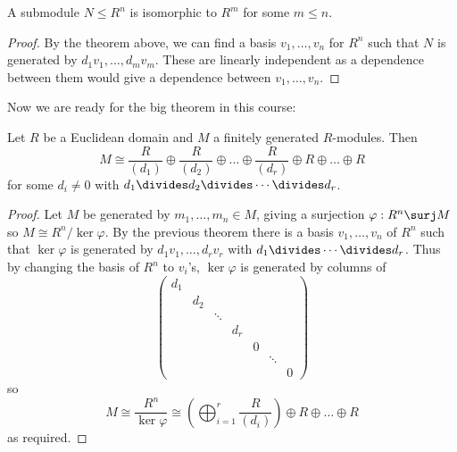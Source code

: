 \documentclass[a4paper]{article}
\theoremstyle{definition}
\begin{document}
\begin{corollary}
  A submodule \(N \leq R^n\) is isomorphic to \(R^m\) for some \(m \leq n\).
\end{corollary}

\begin{proof}
  By the theorem above, we can find a basis \(v_1, \dots, v_n\) for \(R^n\) such that \(N\) is generated by \(d_1v_1, \dots, d_mv_m\). These are linearly independent as a dependence between them would give a dependence between \(v_1, \dots, v_n\).
\end{proof}

Now we are ready for the big theorem in this course:

\begin{theorem}
  \label{thm:module over ED}
  Let \(R\) be a Euclidean domain and \(M\) a finitely generated \(R\)-modules. Then
  \[
    M \cong \frac{R}{(d_1)} \oplus \frac{R}{(d_2)} \oplus \dots \oplus \frac{R}{(d_r)} \oplus R \oplus \dots \oplus R
  \]
  for some \(d_i \neq 0\) with \(d_1 \divides d_2 \divides \cdots \divides d_r\).
\end{theorem}

\begin{proof}
  Let \(M\) be generated by \(m_1, \dots, m_n \in M\), giving a surjection \(\varphi: R^n \surj M\) so \(M \cong R^n/\ker \varphi\). By the previous theorem there is a basis \(v_1, \dots, v_n\) of \(R^n\) such that \(\ker \varphi\) is generated by \(d_1v_1, \dots, d_rv_r\) with \(d_1 \divides \cdots \divides d_r\). Thus by changing the basis of \(R^n\) to \(v_i\)'s, \(\ker \varphi\) is generated by columns of
  \[
    \begin{pmatrix}
      d_1 \\
      & d_2 \\
      & & \ddots \\
      & & & d_r \\
      & & & & 0 \\
      & & & & & \ddots \\
      & & & & & & 0
    \end{pmatrix}
  \]
  so
  \[
    M \cong \frac{R^n}{\ker \varphi} \cong \left( \bigoplus_{i = 1}^r \frac{R}{(d_i)} \right) \oplus R \oplus \dots \oplus R
  \]
  as required.
\end{proof}
\end{document}
